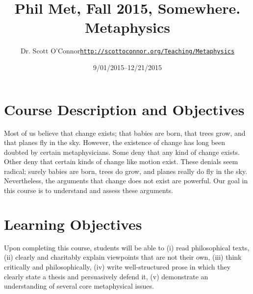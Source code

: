 \documentclass[11pt,article,oneside]{memoir}
\def\myauthor{Author}
\def\mytitle{Title}
\def\mycopyright{\myauthor}
\def\myweb{\href{http://scottoconnor.org/Teaching/Metaphysics}{http://scottoconnor.org/Teaching/Metaphysics}}
\def\myauthor{Dr. Scott O'Connor}
\def\mytitle{{\normalsize Phil Met, Fall 2015, Somewhere. \newline} \HUGE Metaphysics}
\begin{document}
\setsansfont[Mapping=tex-text]{Georgia} 
\setmonofont[Mapping=tex-text,Scale=0.8]{Georgia} 

\def\ind{\hangindent=1 true cm\hangafter=1 \noindent}
\def\labelitemi{$\cdot$}

\pagestyle{kjh}

\title{\LARGE\mytitle}     
\author{\Large\myauthor \newline \footnotesize\texttt{\noindent\myweb}}
\date{9/01/2015--12/21/2015}

\published{\,}

\maketitle




%
%

\section{Course Description and Objectives}

Most of us believe that change exists; that babies are born, that trees grow, and that planes fly in the sky. However, the existence of change has long been doubted by certain metaphysicians. Some deny that any kind of change exists. Other deny that certain kinds of change like motion exist. These denials seem radical; surely babies are born, trees do grow, and planes really do fly in the sky. Nevertheless, the arguments that change does not exist are powerful. Our goal in this course is to understand and assess these arguments. 


\section{Learning Objectives}

Upon completing this course, students will be able to (i) read
philosophical texts, (ii) clearly and charitably explain viewpoints that
are not their own, (iii) think critically and philosophically, (iv)
write well-structured prose in which they clearly state a thesis and
persuasively defend it, (v) demonstrate an understanding of several core
metaphysical issues.
\end{document}
